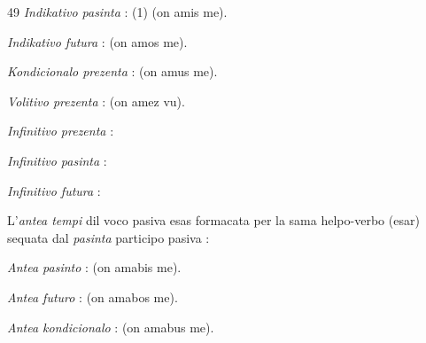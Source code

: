 \begin{VUpage}[53]{49}
\textit{Indikativo pasinta} :  (1) (on amis me).

\textit{Indikativo futura} :  (on amos me).

\textit{Kondicionalo prezenta} :  (on amus me).

\textit{Volitivo prezenta} :  (on amez vu).

\textit{Infinitivo prezenta} : 

\textit{Infinitivo pasinta} : 

\textit{Infinitivo futura} : 

\VUblanc{2.71pt}%
L'\textit{antea tempi} dil voco pasiva esas formacata per la sama\nl
helpo-verbo (esar) sequata dal \textit{pasinta} participo pasiva :

\VUblanc{2.64pt}%
\textit{Antea pasinto} :  (on amabis me).

\textit{Antea futuro} :  (on amabos me).

\textit{Antea kondicionalo} :  (on amabus me).
\end{VUpage}

